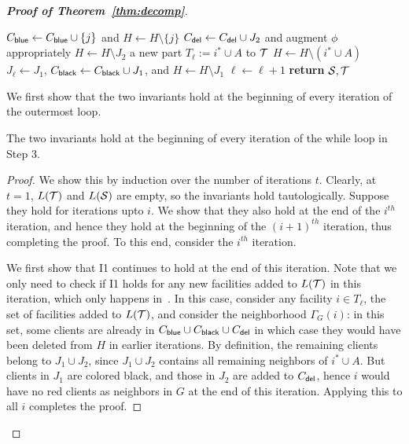 \begin{proof}[{\bf Proof of Theorem~\ref{thm:decomp}}]
\begin{algorithm}
\begin{algorithmic}[1]
\State $C_{\mathsf{blue}} \gets C_{\mathsf{blue}} \cup \{j\}$ and $H \gets H \setminus \{j\}$  \label{alg:case2ac}
\EndFor
\Else {}
\State $C_{\mathsf{del}} \gets C_{\mathsf{del}} \cup J_2$ and augment $\phi$ appropriately  \label{alg:phi2}
\State $H \gets H \setminus J_2$
 a new part $T_\ell := i^* \cup A$ to ${\cal T}$  \label{alg:case2b}
\State $H \gets H \setminus (i^* \cup A)$ 
\State $J_\ell \gets J_1$, $C_{\mathsf{black}} \gets C_{\mathsf{black}} \cup J_1$, and $H \gets H \setminus J_1$  \label{alg:color2}
\State $\ell \gets \ell + 1$
\EndIf
\EndWhile\label{euclidendwhile}
\State \textbf{return} ${\cal S},{\cal T}$
\EndProcedure
\end{algorithmic}
\end{algorithm}


We first show that the two invariants hold at the beginning of every iteration of the outermost loop.

\begin{claim}
\label{cl:inv}
The two invariants hold at the beginning of every iteration of the while loop in Step 3.
\end{claim}
\begin{proof}
We show this by induction over the number of iterations $t$. Clearly, at $t=1$, $L({\cal T})$ and $L({\cal S})$ are empty, so the invariants hold tautologically. Suppose they hold for iterations upto $i$. We show that they also hold at the end of the $i^{th}$ iteration, and hence they hold at the beginning of the $(i+1)^{th}$ iteration, thus completing the proof. To this end, consider the $i^{th}$ iteration.

\medskip \noindent We first show that I1 continues to hold at the end of this iteration. Note that we only need to check if I1 holds for any new facilities added to $L({\cal T})$ in this iteration, which only happens in~. In this case, consider any facility $i \in T_\ell$, the set of facilities added to $L({\cal T})$, and consider the neighborhood $\Gamma_G(i)$: in this set, some clients are already in $C_{\mathsf{blue}} \cup C_{\mathsf{black}} \cup C_{\mathsf{del}}$ in which case they would have been deleted from $H$ in earlier iterations. By definition, the remaining clients belong to $J_1 \cup J_2$, since $J_1 \cup J_2$ contains all remaining neighbors of $i^* \cup A$. But clients in $J_1$ are colored black, and those in $J_2$ are added to $C_{\mathsf{del}}$, hence $i$ would have no red clients as neighbors in $G$ at the end of this iteration. Applying this to all $i$ completes the proof.


\end{proof}
\end{proof}
